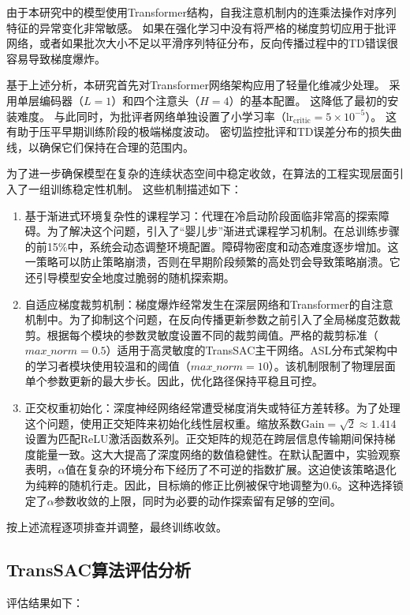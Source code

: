 由于本研究中的模型使用Transformer结构，自我注意机制内的连乘法操作对序列特征的异常变化非常敏感。 如果在强化学习中没有将严格的梯度剪切应用于批评网络，或者如果批次大小不足以平滑序列特征分布，反向传播过程中的TD错误很容易导致梯度爆炸。

基于上述分析，本研究首先对Transformer网络架构应用了轻量化维减少处理。 采用单层编码器（$L=1$）和四个注意头（$H=4$）的基本配置。 这降低了最初的安装难度。 与此同时，为批评者网络单独设置了小学习率（$\mathrm{lr}_{\mathrm{critic}}=5 \times 10^{-5}$）。 这有助于压平早期训练阶段的极端梯度波动。 密切监控批评和TD误差分布的损失曲线，以确保它们保持在合理的范围内。

为了进一步确保模型在复杂的连续状态空间中稳定收敛，在算法的工程实现层面引入了一组训练稳定性机制。 这些机制描述如下：

\begin{enumerate}

\item 基于渐进式环境复杂性的课程学习：代理在冷启动阶段面临非常高的探索障碍。为了解决这个问题，引入了“婴儿步”渐进式课程学习机制。在总训练步骤的前15\%中，系统会动态调整环境配置。障碍物密度和动态难度逐步增加。这一策略可以防止策略崩溃，否则在早期阶段频繁的高处罚会导致策略崩溃。它还引导模型安全地度过脆弱的随机探索期。

\item 自适应梯度裁剪机制：梯度爆炸经常发生在深层网络和Transformer的自注意机制中\cite{decision-transformer}。为了抑制这个问题，在反向传播更新参数之前引入了全局梯度范数裁剪。根据每个模块的参数灵敏度设置不同的裁剪阈值。严格的裁剪标准（$max\_norm=0.5$）适用于高灵敏度的TransSAC主干网络。ASL分布式架构中的学习者模块使用较温和的阈值（$max\_norm=10$）。该机制限制了物理层面单个参数更新的最大步长。因此，优化路径保持平稳且可控。

\item 正交权重初始化：深度神经网络经常遭受梯度消失或特征方差转移。为了处理这个问题，使用正交矩阵来初始化线性层权重。缩放系数$\text{Gain} = \sqrt{2} \approx 1.414$设置为匹配ReLU激活函数系列。正交矩阵的规范在跨层信息传输期间保持梯度能量一致。这大大提高了深度网络的数值稳健性。在默认配置中，实验观察表明，$\alpha$值在复杂的环境分布下经历了不可逆的指数扩展。这迫使该策略退化为纯粹的随机行走。因此，目标熵的修正比例被保守地调整为0.6。这种选择锁定了$\alpha$参数收敛的上限，同时为必要的动作探索留有足够的空间。

\end{enumerate}

按上述流程逐项排查并调整，最终训练收敛。
\subsection{TransSAC算法评估分析}
评估结果如下：

